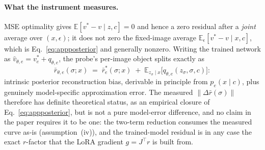 \paragraph{What the instrument measures.}
MSE optimality gives $\mathbb{E}[v^{*} - v \mid z, c] = 0$ and hence a
zero residual after a \emph{joint} average over $(x, \epsilon)$; it
does not zero the fixed-image average
$\mathbb{E}_\epsilon[v^{*} - v \mid x, c]$, which is
Eq.~\ref{eq:appposterior} and generally nonzero. Writing the trained
network as $\hat v_{\theta,e} = v_e^{*} + q_{\theta,e}$, the probe's
per-image object splits exactly as
\begin{equation}
\bar r_{\theta,e}(\sigma; x)
\;=\; \bar r_e^{*}(\sigma; x)
\;+\; \mathbb{E}_{z_\sigma \mid x}\big[q_{\theta,e}(z_\sigma, \sigma,
c)\big]:
\label{eq:appsplit}
\end{equation}
intrinsic posterior reconstruction bias, derivable in principle from
$p_e(x \mid c)$, plus genuinely model-specific approximation error.
The measured $\|\Delta \bar r(\sigma)\|$ therefore has definite
theoretical status, as an empirical closure of
Eq.~\ref{eq:appposterior}, but is not a pure model-error
difference, and no claim in the paper requires it to be one: the
two-term reduction consumes the measured curve as-is
(assumption~(iv)), and the trained-model residual is in any case the
exact $r$-factor that the LoRA gradient $g = J^{\!\top} r$ is built
from.

